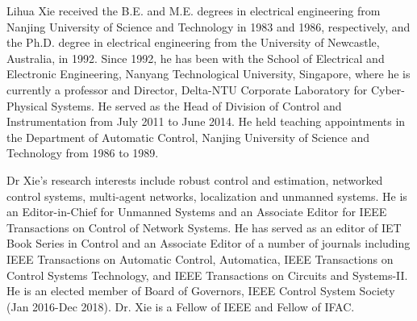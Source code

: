 \documentclass[journal]{IEEEtran}
\begin{document}
\begin{IEEEbiography}{Lihua Xie}
	received the B.E. and M.E. degrees in electrical engineering from Nanjing University of Science and Technology in 1983 and 1986, respectively, and the Ph.D. degree in electrical engineering from the University of Newcastle, Australia, in 1992. Since 1992, he has been with the School of Electrical and Electronic Engineering, Nanyang Technological University, Singapore, where he is currently a professor and Director, Delta-NTU Corporate Laboratory for Cyber-Physical Systems. He served as the Head of Division of Control and Instrumentation from July 2011 to June 2014. He held teaching appointments in the Department of Automatic Control, Nanjing University of Science and Technology from 1986 to 1989. 
	
	Dr Xie's research interests include robust control and estimation, networked control systems, multi-agent networks, localization and unmanned systems. He is an Editor-in-Chief for Unmanned Systems and an Associate Editor for IEEE Transactions on Control of Network Systems. He has served as an editor of IET Book Series in Control and an Associate Editor of a number of journals including IEEE Transactions on Automatic Control, Automatica, IEEE Transactions on Control Systems Technology, and IEEE Transactions on Circuits and Systems-II. He is an elected member of Board of Governors, IEEE Control System Society (Jan 2016-Dec 2018). Dr. Xie is a Fellow of IEEE and Fellow of IFAC.
\end{IEEEbiography}







\end{document}
